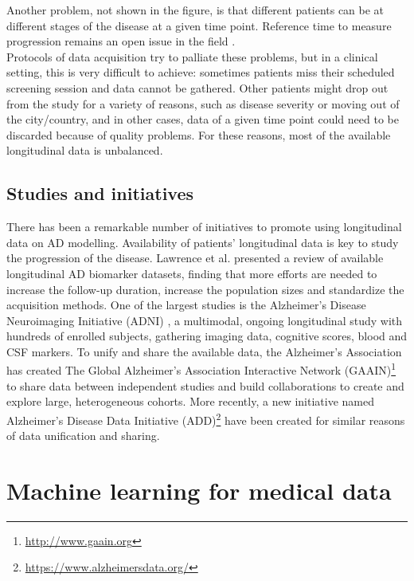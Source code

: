 Another problem, not shown in the figure, is that different patients can be at different stages of the disease at a given time point. Reference time to measure progression remains an open issue in the field \cite{Ashford2001}.  \\

Protocols of data acquisition try to palliate these problems, but in a clinical setting, this is very difficult to achieve: sometimes patients miss their scheduled screening session and data cannot be gathered. Other patients might drop out from the study for a variety of reasons, such as disease severity or moving out of the city/country, and in other cases, data of a given time point could need to be discarded because of quality problems. For these reasons, most of the available longitudinal data is unbalanced. \\

\subsection{Studies and initiatives} 

There has been a remarkable number of initiatives to promote using longitudinal data on AD modelling. Availability of patients' longitudinal data is key to study the progression of the disease. Lawrence et al. \cite{Lawrence2017} presented a review of available longitudinal AD biomarker datasets, finding that more efforts are needed to increase the follow-up duration, increase the population sizes and standardize the acquisition methods. One of the largest studies is the Alzheimer's Disease Neuroimaging Initiative (ADNI) \cite{Mueller2005}, a multimodal, ongoing longitudinal study with hundreds of enrolled subjects, gathering imaging data, cognitive scores, blood and CSF markers. To unify and share the available data, the Alzheimer's Association has created The Global Alzheimer’s Association Interactive Network (GAAIN)\footnote{\url{http://www.gaain.org}} to share data between independent studies and build collaborations to create and explore large, heterogeneous cohorts. More recently, a new initiative named Alzheimer's Disease Data Initiative (ADD)\footnote{\url{https://www.alzheimersdata.org/}} have been created for similar reasons of data unification and sharing. \\

\section{Machine learning for medical data}

